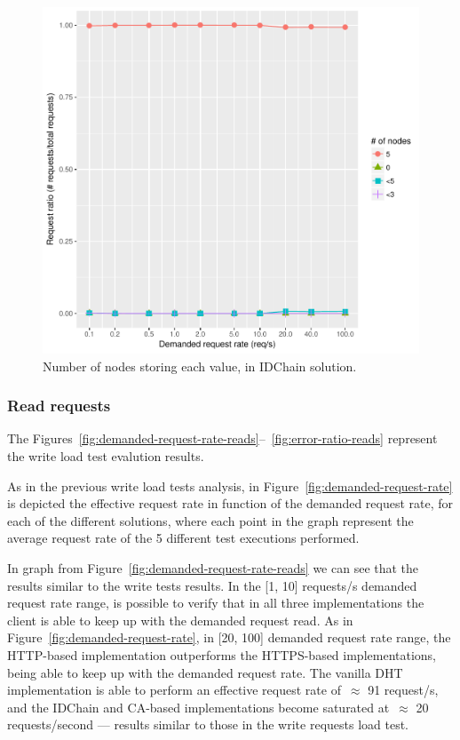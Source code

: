 \begin{figure}[H]
  \centering
  \includegraphics[scale=0.4]{Figures/evaluation/stored-ratio-https-bc.pdf}
  \caption{Number of nodes storing each value, in IDChain solution.}
\label{fig:stored-ratio-https-bc}
\end{figure}

\subsubsection{Read requests}

The Figures~\ref{fig:demanded-request-rate-reads}–~\ref{fig:error-ratio-reads} represent the write load test evalution results.

As in the previous write load tests analysis, in Figure~\ref{fig:demanded-request-rate} is depicted the effective request rate in function of the demanded request rate, for each of the different solutions, where each point in the graph represent the average request rate of the 5 different test executions performed.

In graph from Figure~\ref{fig:demanded-request-rate-reads} we can see that the results similar to the write tests results.
In the [1, 10] requests/s demanded request rate range, is possible to verify that in all three implementations the client is able to keep up with the demanded request read.
As in Figure~\ref{fig:demanded-request-rate}, in [20, 100] demanded request rate range, the HTTP-based implementation outperforms the HTTPS-based implementations, being able to keep up with the demanded request rate.
The vanilla DHT implementation is able to perform an effective request rate of~$\approx$ 91 request/s, and the IDChain and CA-based implementations become saturated at~$\approx$ 20 requests/second — results similar to those in the write requests load test.

